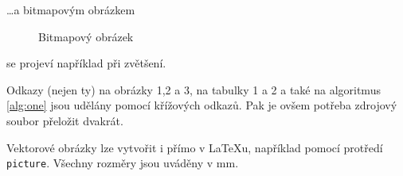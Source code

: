 \documentclass[11pt,a4paper]{article}
\begin{document}
\ldots a bitmapovým obrázkem

\begin{center}
\begin{figure}[h]\caption{Bitmapový obrázek}\end{figure}
\end{center}

se projeví například při zvětšení.

Odkazy (nejen ty) na obrázky 1,2 a 3, na tabulky 1 a 2 a také na algoritmus \ref{alg:one} jsou udělány pomocí křížových odkazů. Pak je ovšem potřeba zdrojový soubor přeložit dvakrát.

Vektorové obrázky lze vytvořit i přímo v {\LaTeX}u, například pomocí protředí \verb|picture|. Všechny rozměry jsou uváděny v mm.
\end{document}
